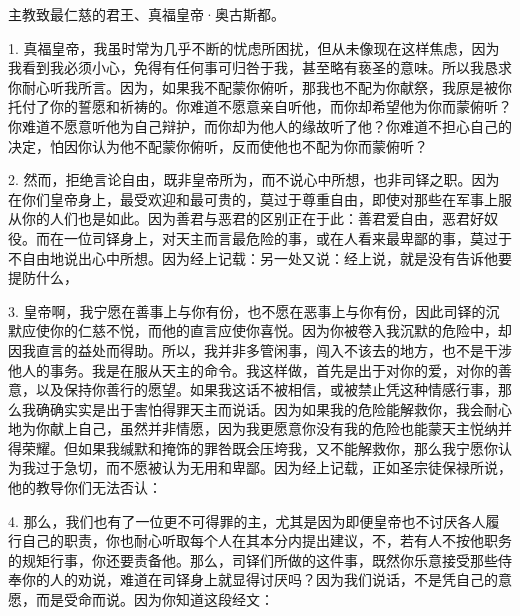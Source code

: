 主教致最仁慈的君王、真福皇帝·奥古斯都。\par

1. 真福皇帝，我虽时常为几乎不断的忧虑所困扰，但从未像现在这样焦虑，因为我看到我必须小心，免得有任何事可归咎于我，甚至略有亵圣的意味。所以我恳求你耐心听我所言。因为，如果我不配蒙你俯听，那我也不配为你献祭，我原是被你托付了你的誓愿和祈祷的。你难道不愿意亲自听他，而你却希望他为你而蒙俯听？你难道不愿意听他为自己辩护，而你却为他人的缘故听了他？你难道不担心自己的决定，怕因你认为他不配蒙你俯听，反而使他也不配为你而蒙俯听？\par

2. 然而，拒绝言论自由，既非皇帝所为，而不说心中所想，也非司铎之职。因为在你们皇帝身上，最受欢迎和最可贵的，莫过于尊重自由，即使对那些在军事上服从你的人们也是如此。因为善君与恶君的区别正在于此：善君爱自由，恶君好奴役。而在一位司铎身上，对天主而言最危险的事，或在人看来最卑鄙的事，莫过于不自由地说出心中所想。因为经上记载：另一处又说：经上说，就是没有告诉他要提防什么，\par

3. 皇帝啊，我宁愿在善事上与你有份，也不愿在恶事上与你有份，因此司铎的沉默应使你的仁慈不悦，而他的直言应使你喜悦。因为你被卷入我沉默的危险中，却因我直言的益处而得助。所以，我并非多管闲事，闯入不该去的地方，也不是干涉他人的事务。我是在服从天主的命令。我这样做，首先是出于对你的爱，对你的善意，以及保持你善行的愿望。如果我这话不被相信，或被禁止凭这种情感行事，那么我确确实实是出于害怕得罪天主而说话。因为如果我的危险能解救你，我会耐心地为你献上自己，虽然并非情愿，因为我更愿意你没有我的危险也能蒙天主悦纳并得荣耀。但如果我缄默和掩饰的罪咎既会压垮我，又不能解救你，那么我宁愿你认为我过于急切，而不愿被认为无用和卑鄙。因为经上记载，正如圣宗徒保禄所说，他的教导你们无法否认： \par

4. 那么，我们也有了一位更不可得罪的主，尤其是因为即便皇帝也不讨厌各人履行自己的职责，你也耐心听取每个人在其本分内提出建议，不，若有人不按他职务的规矩行事，你还要责备他。那么，司铎们所做的这件事，既然你乐意接受那些侍奉你的人的劝说，难道在司铎身上就显得讨厌吗？因为我们说话，不是凭自己的意愿，而是受命而说。因为你知道这段经文： \par

